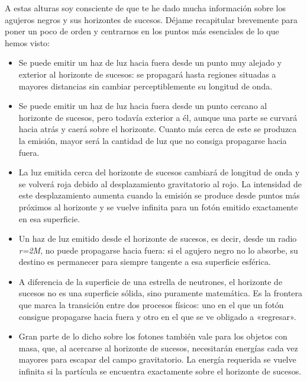 A estas alturas soy consciente de que te he dado mucha información sobre los agujeros negros y sus horizontes de sucesos. Déjame recapitular brevemente para poner un poco de orden y centrarnos en los puntos más esenciales de lo que hemos visto:

\begin{itemize}
\item Se puede emitir un haz de luz hacia fuera desde un punto muy alejado y exterior al horizonte de sucesos: se propagará hasta regiones situadas a mayores distancias sin cambiar perceptiblemente su longitud de onda.

\item Se puede emitir un haz de luz hacia fuera desde un punto cercano al horizonte de sucesos, pero todavía exterior a él, aunque una parte se curvará hacia atrás y caerá sobre el horizonte. Cuanto más cerca de este se produzca la emisión, mayor será la cantidad de luz que no consiga propagarse hacia fuera.

\item La luz emitida cerca del horizonte de sucesos cambiará de longitud de onda y se volverá roja debido al desplazamiento gravitatorio al rojo. La intensidad de este desplazamiento aumenta cuando la emisión se produce desde puntos más próximos al horizonte y se vuelve infinita para un fotón emitido exactamente en esa superficie.

\item Un haz de luz emitido desde el horizonte de sucesos, es decir, desde un radio \emph{r=2M}, no puede propagarse hacia fuera: si el agujero negro no lo absorbe, su destino es permanecer para siempre tangente a esa superficie esférica.

\item A diferencia de la superficie de una estrella de neutrones, el horizonte de sucesos no es una superficie sólida, sino puramente matemática. Es la frontera que marca la transición entre dos procesos físicos: uno en el que un fotón consigue propagarse hacia fuera y otro en el que se ve obligado a «regresar».

\item Gran parte de lo dicho sobre los fotones también vale para los objetos con masa, que, al acercarse al horizonte de sucesos, necesitarán energías cada vez mayores para escapar del campo gravitatorio. La energía requerida se vuelve infinita si la partícula se encuentra exactamente sobre el horizonte de sucesos.
\end{itemize}

